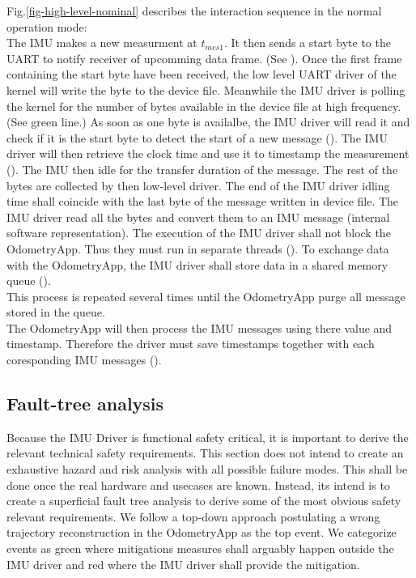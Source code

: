 Fig.\ref{fig-high-level-nominal} describes the interaction sequence in the normal operation mode:\\
The IMU makes a new measurment at $t_{mes1}$.
It then sends a start byte to the UART to notify receiver of upcomming data frame. (See ).
Once the first frame containing the start byte have been received, the low level UART driver of the kernel will write the byte to the device file.
Meanwhile the IMU driver is polling the kernel for the number of bytes available in the device file at high frequency. (See green line.)
As soon as one byte is availalbe, the IMU driver will read it and check if it is the start byte to detect the start of a new message ().
The IMU driver will then retrieve the clock time and use it to timestamp the measurement ().
The IMU then idle for the transfer duration of the message.
The rest of the bytes are collected by then low-level driver.
The end of the IMU driver idling time shall coincide with the last byte of the message written in device file.
The IMU driver read all the bytes and convert them to an IMU message (internal software representation).
The execution of the IMU driver shall not block the OdometryApp. Thus they must run in separate threads ().
To exchange data with the OdometryApp, the IMU driver shall store data in a shared memory queue ().\\
This process is repeated several times until the OdometryApp purge all message stored in the queue.\\
The OdometryApp will then process the IMU messages using there value and timestamp.
Therefore the driver must save timestamps together with each coresponding IMU messages ().

\subsection{Fault-tree analysis}
Because the IMU Driver is functional safety critical, it is important to derive the relevant technical safety requirements.
This section does not intend to create an exhaustive hazard and risk analysis with all possible failure modes.
This shall be done once the real hardware and usecases are known.
Instead, its intend is to create a superficial fault tree analysis to derive some of the most obvious safety relevant requirements.
We follow a top-down approach postulating a wrong trajectory reconstruction in the OdometryApp as the top event.
We categorize events as green where mitigations measures shall arguably happen outside the IMU driver and red where the IMU driver shall provide the mitigation.

